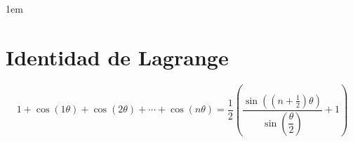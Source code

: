 \documentclass[12pt, fleqn]{report}                             %
\newenvironment{SmallIndentation}[1][0.75em]                    %
    {\begin{adjustwidth}{#1}{}\begin{footnotesize}}                 %
    {\end{footnotesize}\end{adjustwidth}}                           %
\newcommand{\Wrap}[1]{\left( #1 \right)}                        %
\newcommand{\Cos}[1]{\cos\Wrap{#1}}
\newcommand{\Sin}[1]{\sin\Wrap{#1}}
\begin{document}
\begin{itemize}
\begin{SmallIndentation}[1em]
                        \end{SmallIndentation}


                \end{itemize}





        \clearpage
        \section{Identidad de Lagrange}

            \begin{equation}
                1+\Cos{1\theta}+\Cos{2\theta}+\cdots+\Cos{n\theta}  = 
                    \dfrac{1}{2} \Wrap{\dfrac{\Sin{(n+\frac{1}{2})\theta}}{\Sin{\dfrac{\theta}{2}}}+1}
            \end{equation}
                
\end{document}
